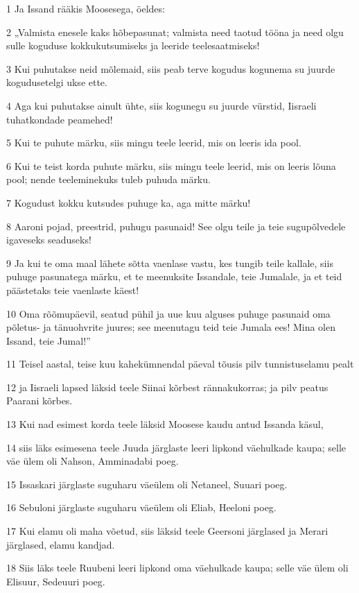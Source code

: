 \par 1 Ja Issand rääkis Moosesega, öeldes:
\par 2 „Valmista enesele kaks hõbepasunat; valmista need taotud tööna ja need olgu sulle koguduse kokkukutsumiseks ja leeride teelesaatmiseks!
\par 3 Kui puhutakse neid mõlemaid, siis peab terve kogudus kogunema su juurde kogudusetelgi ukse ette.
\par 4 Aga kui puhutakse ainult ühte, siis kogunegu su juurde vürstid, Iisraeli tuhatkondade peamehed!
\par 5 Kui te puhute märku, siis mingu teele leerid, mis on leeris ida pool.
\par 6 Kui te teist korda puhute märku, siis mingu teele leerid, mis on leeris lõuna pool; nende teeleminekuks tuleb puhuda märku.
\par 7 Kogudust kokku kutsudes puhuge ka, aga mitte märku!
\par 8 Aaroni pojad, preestrid, puhugu pasunaid! See olgu teile ja teie sugupõlvedele igaveseks seaduseks!
\par 9 Ja kui te oma maal lähete sõtta vaenlase vastu, kes tungib teile kallale, siis puhuge pasunatega märku, et te meenuksite Issandale, teie Jumalale, ja et teid päästetaks teie vaenlaste käest!
\par 10 Oma rõõmupäevil, seatud pühil ja uue kuu alguses puhuge pasunaid oma põletus- ja tänuohvrite juures; see meenutagu teid teie Jumala ees! Mina olen Issand, teie Jumal!”
\par 11 Teisel aastal, teise kuu kahekümnendal päeval tõusis pilv tunnistuselamu pealt
\par 12 ja Iisraeli lapsed läksid teele Siinai kõrbest rännakukorras; ja pilv peatus Paarani kõrbes.
\par 13 Kui nad esimest korda teele läksid Moosese kaudu antud Issanda käsul,
\par 14 siis läks esimesena teele Juuda järglaste leeri lipkond väehulkade kaupa; selle väe ülem oli Nahson, Amminadabi poeg.
\par 15 Issaskari järglaste suguharu väeülem oli Netaneel, Suuari poeg.
\par 16 Sebuloni järglaste suguharu väeülem oli Eliab, Heeloni poeg.
\par 17 Kui elamu oli maha võetud, siis läksid teele Geersoni järglased ja Merari järglased, elamu kandjad.
\par 18 Siis läks teele Ruubeni leeri lipkond oma väehulkade kaupa; selle väe ülem oli Elisuur, Sedeuuri poeg.

